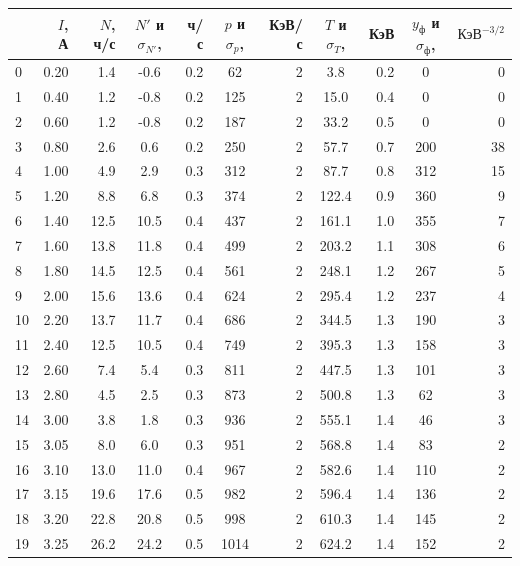 \documentclass[a4paper,12pt]{article}
\begin{document}
\begin{table}[!ht]
    \centering
    \begin{tabular}{|l|r|r|cr|cr|cr|cr|}
        \hline
         & $I$, А & $N$, ч/с & $N'$ и $\sigma_{N'}$,  & ч/с & $p$ и $\sigma_p$,  & КэВ/с & $T$ и $\sigma_T$,  & КэВ&  $y_\text{ф}$ и $\sigma_\text{ф}$, &  $\text{КэВ}^{-3/2}$ \\ \hline
        0 & 0.20 & 1.4 & -0.6 & 0.2 & 62 & 2 & 3.8 & 0.2 & 0 & 0 \\
        1 & 0.40 & 1.2 & -0.8 & 0.2 & 125 & 2 & 15.0 & 0.4 & 0 & 0 \\
        2 & 0.60 & 1.2 & -0.8 & 0.2 & 187 & 2 & 33.2 & 0.5 & 0 & 0 \\
        3 & 0.80 & 2.6 & 0.6 & 0.2 & 250 & 2 & 57.7 & 0.7 & 200 & 38 \\
        4 & 1.00 & 4.9 & 2.9 & 0.3 & 312 & 2 & 87.7 & 0.8 & 312 & 15 \\
        5 & 1.20 & 8.8 & 6.8 & 0.3 & 374 & 2 & 122.4 & 0.9 & 360 & 9 \\
        6 & 1.40 & 12.5 & 10.5 & 0.4 & 437 & 2 & 161.1 & 1.0 & 355 & 7 \\
        7 & 1.60 & 13.8 & 11.8 & 0.4 & 499 & 2 & 203.2 & 1.1 & 308 & 6 \\
        8 & 1.80 & 14.5 & 12.5 & 0.4 & 561 & 2 & 248.1 & 1.2 & 267 & 5 \\
        9 & 2.00 & 15.6 & 13.6 & 0.4 & 624 & 2 & 295.4 & 1.2 & 237 & 4 \\
        10 & 2.20 & 13.7 & 11.7 & 0.4 & 686 & 2 & 344.5 & 1.3 & 190 & 3 \\
        11 & 2.40 & 12.5 & 10.5 & 0.4 & 749 & 2 & 395.3 & 1.3 & 158 & 3 \\
        12 & 2.60 & 7.4 & 5.4 & 0.3 & 811 & 2 & 447.5 & 1.3 & 101 & 3 \\
        13 & 2.80 & 4.5 & 2.5 & 0.3 & 873 & 2 & 500.8 & 1.3 & 62 & 3 \\
        14 & 3.00 & 3.8 & 1.8 & 0.3 & 936 & 2 & 555.1 & 1.4 & 46 & 3 \\
        15 & 3.05 & 8.0 & 6.0 & 0.3 & 951 & 2 & 568.8 & 1.4 & 83 & 2 \\
        16 & 3.10 & 13.0 & 11.0 & 0.4 & 967 & 2 & 582.6 & 1.4 & 110 & 2 \\
        17 & 3.15 & 19.6 & 17.6 & 0.5 & 982 & 2 & 596.4 & 1.4 & 136 & 2 \\
        18 & 3.20 & 22.8 & 20.8 & 0.5 & 998 & 2 & 610.3 & 1.4 & 145 & 2 \\
        19 & 3.25 & 26.2 & 24.2 & 0.5 & 1014 & 2 & 624.2 & 1.4 & 152 & 2 \\

\end{tabular}
\end{table}
\end{document}
